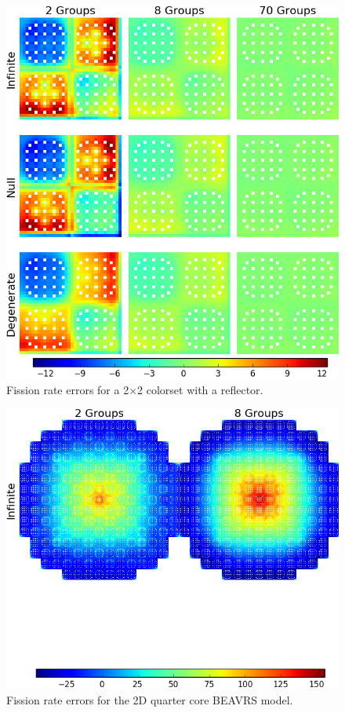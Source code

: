 \begin{figure}[h!]
\centering
\includegraphics[width=\linewidth]{figures/quantification/reflector/fiss-err}
\caption[Fission rate errors for a 2$\times$2 colorset with a reflector]{Fission rate errors for a 2$\times$2 colorset with a reflector.}
\label{fig:chap8-reflector-fiss-err}
\end{figure}

\begin{figure}[h!]
\centering
\includegraphics[width=\linewidth]{figures/quantification/full-core/fiss-err}
\caption[Fission rate errors for the 2D quarter core \ac{BEAVRS} model]{Fission rate errors for the 2D quarter core \ac{BEAVRS} model.}
\label{fig:chap8-full-core-fiss-err}
\end{figure}

